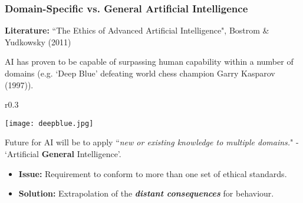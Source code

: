 \documentclass[10pt, compress]{beamer}
\begin{document}
\begin{frame}[fragile]
  \frametitle{Domain-Specific vs. General Artificial Intelligence}
  
   \small{ 
   
   \vspace{-10pt}
   
   	\textbf{Literature:} ``The Ethics of Advanced Artificial Intelligence", Bostrom \& Yudkowsky (2011)
   	
   	\vspace{10pt}
   	
   	AI has proven to be capable of surpassing human capability within a number of domains (e.g. `Deep Blue' defeating world chess champion Garry Kasparov (1997)).
   	
   	      
      \begin{wrapfigure}{r}{0.3\textwidth}
   \vspace{-15pt}
  \begin{center}
    \texttt{[image: deepblue.jpg]}
    \vspace{-30pt}
  \end{center}
  \end{wrapfigure}
   	
   	
   	\vspace{10pt}
   
   Future for AI will be to apply ``\textit{new or existing knowledge to multiple domains.}" - `Artificial \textbf{General} Intelligence'.
   
   \begin{itemize}
   	\item \textbf{Issue:} Requirement to conform to more than one set of ethical standards.
   	\item \textbf{Solution:} Extrapolation of the \textit{\textbf{distant consequences}} for behaviour.
   \end{itemize}
   
     }

\end{frame}
\end{document}
